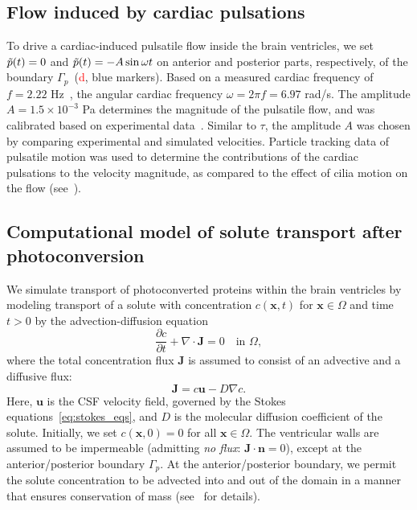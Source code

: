 \documentclass[fleqn]{wlscirep}
\newcommand{\pdifft}[1]{\frac{\partial  #1}{\partial t}}
\newcommand{\Gp}{\Gamma_{p}}
\newcommand{\nn}{\mathbf{n}}
\newcommand{\uu}{\mathbf{u}}
\newcommand{\xx}{\bm{x}}
\newcommand{\JJ}{\mathbf{J}}
\newcommand{\fixme}[1]{\textcolor{red}{#1}}
\begin{document}
\subsection*{Flow induced by cardiac pulsations}\label{subsec:pressure_bcs}
To drive a cardiac-induced pulsatile flow inside the brain ventricles, we set $\Tilde{p}(t)=0$ and
$\Tilde{p}(t)=-A\sin{\omega t}$ on anterior and posterior parts, respectively, of the
boundary $\Gp$~(\fixme{d}, blue markers).
Based on a measured cardiac frequency of $f=2.22$ Hz~\cite{Olstad2019CiliaryDevelopment},
the angular cardiac frequency $\omega=2\pi f=6.97$ rad/s.
The amplitude $A=1.5\times 10^{-3}$ Pa determines the magnitude of the pulsatile flow,
and was calibrated based on experimental data~\cite{Olstad2019CiliaryDevelopment}.
Similar to $\tau$, the amplitude $A$ was chosen by comparing experimental and simulated velocities.
Particle tracking data of pulsatile motion was used to determine the contributions of the
cardiac pulsations to the velocity magnitude,
as compared to the effect of cilia motion on the flow (see~).

\subsection*{Computational model of solute transport after photoconversion}
We simulate transport of photoconverted proteins within the brain ventricles by
modeling transport of a solute with concentration $c(\xx, t)$ for $\xx\in\Omega$ and
time $t > 0$ by the advection-diffusion equation
\begin{equation}
    \pdifft{c} + \nabla\cdot\JJ = 0 \quad \text{in } \Omega,
    \label{eq:adv_diff_strong}
\end{equation}
where the total concentration flux $\mathbf{J}$ is assumed to consist of an advective and a diffusive flux:
\begin{equation*}
    \JJ = c\uu - D\nabla c .
\end{equation*}
Here, $\uu$ is the CSF velocity field, governed by the Stokes equations~\eqref{eq:stokes_eqs},
and $D$ is the molecular diffusion coefficient of the solute.
Initially, we set $c(\xx, 0)=0$ for all $\xx\in\Omega$.
The ventricular walls are assumed to be impermeable (admitting \emph{no flux}: $\JJ\cdot\nn=0$),
except at the anterior/posterior boundary $\Gamma_p$.
At the anterior/posterior boundary, we permit the solute concentration to be advected into
and out of the domain in a manner that ensures conservation of mass
(see~ for details).
\end{document}
